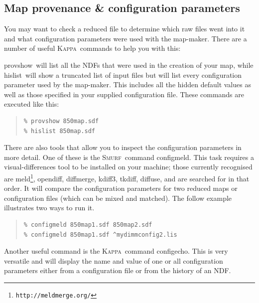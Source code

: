 \documentclass[twoside,11pt]{article}
\newcommand{\htmladdnormallink}[2]{#1}
\newcommand{\latex}[1]{#1}
\newcommand{\xref}[3]{#1}
\newcommand{\xlabel}[1]{}
\renewcommand{\_}{\texttt{\symbol{95}}}
\newenvironment{myquote}{\begin{quote}\begin{small}}{\end{small}\end{quote}}
\newcommand{\Kappa}{\xref{\textsc{Kappa}}{sun95}{}}
\newcommand{\smurf}{\xref{\textsc{Smurf}}{sun258}{}}
\newcommand{\task}[1]{\textsf{#1}}
\newcommand{\configmeld}{\xref{\task{configmeld}}{sun258}{CONFIGMELD}}
\newcommand{\configecho}{\xref{\task{configecho}}{sun95}{CONFIGECHO}}
\newcommand{\hislist}{\xref{\task{hislist}}{sun95}{HISLIST}}
\newcommand{\provshow}{\xref{\task{provshow}}{sun95}{PROVSHOW}}
\begin{document}

\subsection{\xlabel{provenance}Map provenance \& configuration parameters}
\label{sec:prov}

You may want to check a reduced file to determine which raw files went
into it and what configuration parameters were used with the
map-maker. There are a number of useful \Kappa\ commands to help you
with this:

\provshow\ will list all the NDFs that were used in the creation of
your map, while \hislist\ will show a truncated list of input files
but will list every configuration parameter used by the map-maker.
This includes all the hidden default values as well as those specified
in your supplied configuration file. These commands are executed like
this:
\begin{myquote}
\begin{verbatim}
% provshow 850map.sdf
% hislist 850map.sdf
\end{verbatim}
\end{myquote}

There are also tools that allow you to inspect the configuration
parameters in more detail. One of these is the \smurf\ command
\configmeld. This task requires a visual-differences tool to
be installed on your machine; those currently recognised are
\htmladdnormallink{meld}{http://meldmerge.org/}\latex{\footnote{\texttt{http://meldmerge.org/}}},
\htmladdnormallink{opendiff}{http://developer.apple.com/},
\htmladdnormallink{diffmerge}{http://www.sourcegear.com/diffmerge},
\htmladdnormallink{kdiff3}{http://kdiff3.sourceforge.net},
\htmladdnormallink{tkdiff}{http://sourceforge.net/projects/tkdiff},
\htmladdnormallink{diffuse}{http://diffuse.sourceforge.net},
and are searched for in that order. It will compare the
configuration parameters for two reduced maps or configuration files
(which can be mixed and matched). The follow example illustrates two
ways to run it.

\begin{myquote}
\begin{verbatim}
% configmeld 850map1.sdf 850map2.sdf
% configmeld 850map1.sdf ^mydimmconfig2.lis
\end{verbatim}
\end{myquote}
Another useful command is the \Kappa\ command \configecho.
This is very versatile and will display the name and value of one or
all configuration parameters either from a configuration file or from
the history of an NDF.
\end{document}
